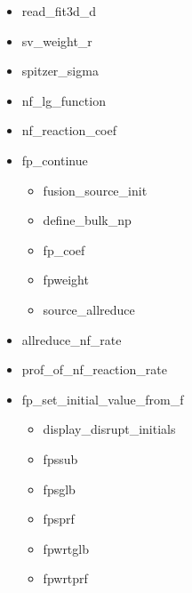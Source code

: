\documentclass[11pt]{article}
\begin{document}
\begin{itemize}
  \item
    read\_fit3d\_d
  \item
    sv\_weight\_r
  \item
    spitzer\_sigma
  \item
    nf\_lg\_function
  \item
    nf\_reaction\_coef
  \item
    fp\_continue
    \begin{itemize}
    \item
      fusion\_source\_init
    \item
      define\_bulk\_np
    \item
      fp\_coef
    \item
      fpweight
    \item
      source\_allreduce
    \end{itemize}
  \item
   allreduce\_nf\_rate
  \item
   prof\_of\_nf\_reaction\_rate
  \item
    fp\_set\_initial\_value\_from\_f
    \begin{itemize}
      \item
        display\_disrupt\_initials
      \item
        fpssub
      \item
        fpsglb
      \item
        fpsprf
      \item
        fpwrtglb
      \item
        fpwrtprf
    \end{itemize}
  \end{itemize}
\end{document}
